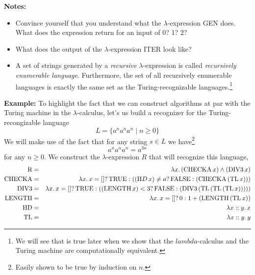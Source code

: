 \documentclass[a4paper,blends,pdf,colorBG,slideColor]{prosper}
\begin{document}
{\bf Notes:}
\begin{itemize}
\item Convince yourself that you understand what the $\lambda$-expression GEN does.  What does the expression
return for an input of $0$? 1? 2?
\item What does the output of the $\lambda$-expression ITER look like?
\item A set of strings generated by a {\em recursive} $\lambda$-expression  is called
{\em recursively enumerable language}.  Furthermore, the set of all recursively enumerable languages is
exactly the same set as the Turing-recognizable languages.\footnote{\tiny We will see that is true later
when we show that the $lambda$-calculus and the Turing machine are computationally equivalent.}
\end{itemize}
\es


{\bf Example:} To highlight the fact that we can construct algorithms at par with the Turing machine in the $\lambda$-calculus, let's us build a recognizer for the Turing-recongizable language
\[
L =\{ a^na^na^n \mid n \ge 0\}
\]
We will make use of the fact that for any string $s \in L$ we have\footnote{\tiny Easily shown to be true by induction
on $n$.}
\[
a^na^na^n = a^{3n}
\]
for any $n \ge 0$.  
We construct the $\lambda$-expression $R$ that will recognize this language,
{\scriptsize
\begin{eqnarray*}
\mbox{R} &=& \lambda x.\, (\mbox{CHECKA}\, x) \wedge (\mbox{DIV3}\, x)\\
\mbox{CHECKA} &=& \lambda x.\, x = []?\, \mbox{TRUE} : ((\mbox HD \, x) \ne a ? \, \mbox{FALSE} : (\mbox{CHECKA}\, (\mbox{TL}\, x)))\\  
\mbox{DIV3} &=&  \lambda x.\, x = []?\, \mbox{TRUE} : ((\mbox{LENGTH}\, x) < 3 ?\, \mbox{FALSE}  : (\mbox{DIV3}\, (\mbox{TL}\, (\mbox{TL}\, (\mbox{TL}\, x)))))\\  
\mbox{LENGTH} &=& \lambda x.\, x = [] ? \, 0 : 1 + (\mbox{LENGTH}\, (\mbox{TL}\, x))\\
\mbox{HD} &=& \lambda x::y.\, x\\
\mbox{TL} &=& \lambda x::y.\, y\\
\end{eqnarray*}
}
\es
\end{document}
